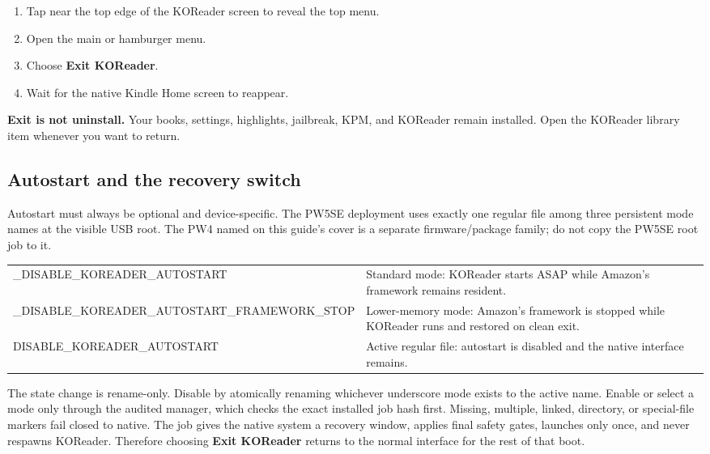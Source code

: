 \documentclass[10pt,letterpaper]{article}
\newcommand{\menupath}[1]{\textsf{\textbf{#1}}}
\begin{document}
\begin{enumerate}
  \item Tap near the top edge of the KOReader screen to reveal the top menu.
  \item Open the main or hamburger menu.
  \item Choose \menupath{Exit KOReader}.
  \item Wait for the native Kindle Home screen to reappear.
\end{enumerate}

\begin{tipbox}
\textbf{Exit is not uninstall.} Your books, settings, highlights, jailbreak, KPM, and KOReader remain installed. Open the KOReader library item whenever you want to return.
\end{tipbox}

\subsection{Autostart and the recovery switch}

Autostart must always be optional and device-specific. The PW5SE deployment uses exactly one regular file among three persistent mode names at the visible USB root. The PW4 named on this guide's cover is a separate firmware/package family; do not copy the PW5SE root job to it.

\begin{tabularx}{\textwidth}{>{\ttfamily}p{} X}
\toprule
\_DISABLE\_KOREADER\_AUTOSTART & Standard mode: KOReader starts ASAP while Amazon's framework remains resident. \\
\_DISABLE\_KOREADER\_AUTOSTART\_FRAMEWORK\_STOP & Lower-memory mode: Amazon's framework is stopped while KOReader runs and restored on clean exit. \\
DISABLE\_KOREADER\_AUTOSTART & Active regular file: autostart is disabled and the native interface remains. \\
\bottomrule
\end{tabularx}

The state change is rename-only. Disable by atomically renaming whichever underscore mode exists to the active name. Enable or select a mode only through the audited manager, which checks the exact installed job hash first. Missing, multiple, linked, directory, or special-file markers fail closed to native. The job gives the native system a recovery window, applies final safety gates, launches only once, and never respawns KOReader. Therefore choosing \menupath{Exit KOReader} returns to the normal interface for the rest of that boot.
\end{document}
